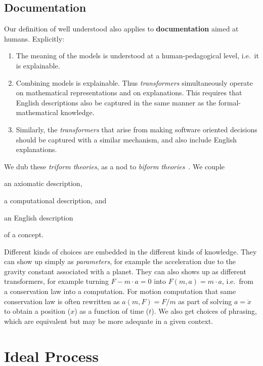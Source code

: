 \documentclass[sigconf,review]{acmart}
\begin{document}
\subsection{Documentation}
Our definition of well understood also applies to \textbf{documentation} aimed
at humans.  Explicitly:
\begin{enumerate}
\item The meaning of the models is understood at a human-pedagogical
level, i.e.\ it is explainable.
\item Combining models is explainable. Thus \emph{transformers}
  simultaneously operate on mathematical representations
and on explanations. This requires that English descriptions also be
captured in the same manner as the formal-mathematical knowledge.
\item Similarly, the \emph{transformers} that arise from making software
oriented decisions should be captured with a similar mechanism, and also include
English explanations.
\end{enumerate}

We dub these \emph{triform theories}, as a nod to \emph{biform
theories}~\cite{Farmer2007}. We couple 
\begin{enumerate*}
\item an axiomatic description,
\item a computational description, and
\item an English description
\end{enumerate*}
of a concept.

Different kinds of choices are embedded in the different kinds of knowledge.
They can show up simply as \emph{parameters}, for example the acceleration due
to the gravity constant associated with a planet. They can also shows up as
different transformers, for example turning $F - m\cdot a = 0$ into $F\left(m,
a\right) = m\cdot a$, i.e.\ from a conservation law into a computation.
For motion computation that same conservation law is often rewritten as
$a\left(m,F\right) = F/m$ as part of solving $a = \ddot{x}$ to obtain a position
($x$) as a function of time ($t$). We also get choices of phrasing, which are
equivalent but may be more adequate in a given context.

\section{Ideal Process}\label{ch:process}
\end{document}
